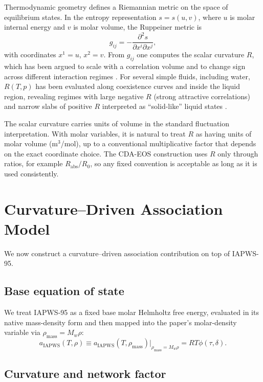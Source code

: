 \documentclass[12pt]{article}
\begin{document}
Thermodynamic geometry defines a Riemannian metric on the space of equilibrium states. In the entropy representation $s=s(u,v)$, where $u$ is molar internal energy and $v$ is molar volume, the Ruppeiner metric is \cite{Ruppeiner1995,Ruppeiner2013}
\begin{equation}
  g_{ij}=-\frac{\partial^2 s}{\partial x^i\partial x^j},
\end{equation}
with coordinates $x^1=u$, $x^2=v$. From $g_{ij}$ one computes the scalar curvature $R$, which has been argued to scale with a correlation volume and to change sign across different interaction regimes \cite{Ruppeiner1995,Ruppeiner2012,Ruppeiner2013}. For several simple fluids, including water, $R(T,p)$ has been evaluated along coexistence curves and inside the liquid region, revealing regimes with large negative $R$ (strong attractive correlations) and narrow slabs of positive $R$ interpreted as ``solid-like'' liquid states \cite{Ruppeiner2012,MayMausbach2015}.

The scalar curvature carries units of volume in the standard fluctuation interpretation. With molar variables, it is natural to treat $R$ as having units of molar volume (m$^3$/mol), up to a conventional multiplicative factor that depends on the exact coordinate choice. The CDA-EOS construction uses $R$ only through ratios, for example $R_{\mathrm{abs}}/R_0$, so any fixed convention is acceptable as long as it is used consistently.

\section{Curvature--Driven Association Model}

We now construct a curvature--driven association contribution on top of IAPWS-95.

\subsection{Base equation of state}

We treat IAPWS-95 as a fixed base molar Helmholtz free energy, evaluated in its native mass-density form and then mapped into the paper's molar-density variable via $\rho_{\mathrm{mass}}=M_w\rho$:
\begin{equation}
  a_{\mathrm{IAPWS}}(T,\rho)\equiv a_{\mathrm{IAPWS}}(T,\rho_{\mathrm{mass}})\big|_{\rho_{\mathrm{mass}}=M_w\rho}=RT\phi(\tau,\delta).
\end{equation}

\subsection{Curvature and network factor}
\end{document}
